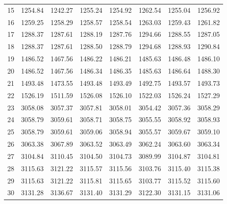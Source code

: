 \documentclass[10pt,oneside]{article}
\begin{document}
\begin{table}[h!]
\begin{tabular}{cccccccc}
15 &   1254.84 & 1242.27 & 1255.24 &    1254.92 &      1262.54 & 1255.04 &   1256.92 \\
16 &   1259.25 & 1258.29 & 1258.57 &    1258.54 &      1263.03 & 1259.43 &   1261.82 \\
17 &   1288.37 & 1287.61 & 1288.19 &    1287.76 &      1294.66 & 1288.55 &   1287.05 \\
18 &   1288.37 & 1287.61 & 1288.50 &    1288.79 &      1294.68 & 1288.93 &   1290.84 \\
19 &   1486.52 & 1467.56 & 1486.22 &    1486.21 &      1485.63 & 1486.48 &   1486.10 \\
20 &   1486.52 & 1467.56 & 1486.34 &    1486.35 &      1485.63 & 1486.64 &   1488.30 \\
21 &   1493.48 & 1473.55 & 1493.48 &    1493.49 &      1492.75 & 1493.57 &   1493.73 \\
22 &   1526.19 & 1511.59 & 1526.08 &    1526.10 &      1522.03 & 1526.24 &   1527.29 \\
23 &   3058.08 & 3057.37 & 3057.81 &    3058.01 &      3054.42 & 3057.36 &   3058.29 \\
24 &   3058.79 & 3059.61 & 3058.71 &    3058.75 &      3055.55 & 3058.92 &   3058.93 \\
25 &   3058.79 & 3059.61 & 3059.06 &    3058.94 &      3055.57 & 3059.67 &   3059.10 \\
26 &   3063.38 & 3067.89 & 3063.52 &    3063.49 &      3062.24 & 3063.60 &   3063.34 \\
27 &   3104.84 & 3110.45 & 3104.50 &    3104.73 &      3089.99 & 3104.87 &   3104.81 \\
28 &   3115.63 & 3121.22 & 3115.57 &    3115.56 &      3103.76 & 3115.40 &   3115.38 \\
29 &   3115.63 & 3121.22 & 3115.81 &    3115.65 &      3103.77 & 3115.52 &   3115.60 \\
30 &   3131.28 & 3136.67 & 3131.40 &    3131.29 &      3122.30 & 3131.15 &   3131.06 \\
\bottomrule
\end{tabular}
\end{table}
\end{document}
